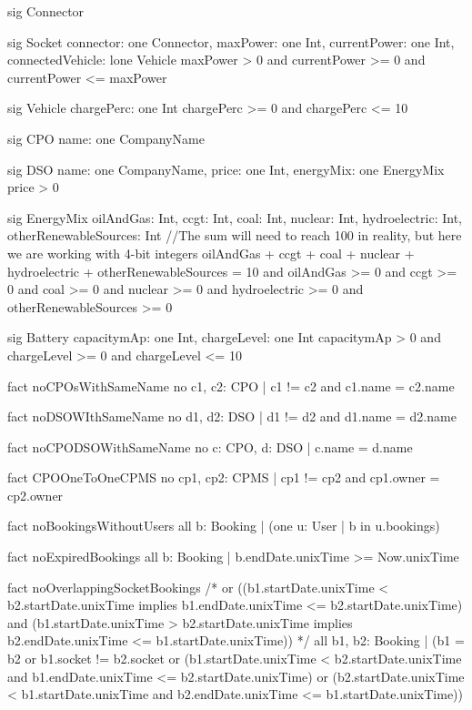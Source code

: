 \documentclass[11pt]{article}
\begin{document}
\begin{ffcode}
    sig Connector {}
    
    sig Socket {
    	connector: one Connector,
    	maxPower: one Int,
    	currentPower: one Int,
    	connectedVehicle: lone Vehicle
    } {
    	maxPower > 0
    	and currentPower >= 0
    	and currentPower <= maxPower
    }
    
    sig Vehicle {
    	chargePerc: one Int
    } {
    	chargePerc >= 0 and chargePerc <= 10
    }
    
    sig CPO {
    	name: one CompanyName
    }
    
    sig DSO {
    	name: one CompanyName,
    	price: one Int,
    	energyMix: one EnergyMix
    } {
    	price > 0
    }
    
    sig EnergyMix {
    	oilAndGas: Int,
    	ccgt: Int,
    	coal: Int,
    	nuclear: Int,
    	hydroelectric: Int,
    	otherRenewableSources: Int
    } {
    	//The sum will need to reach 100 in reality, but here we are working with 4-bit integers
    	oilAndGas + ccgt + coal + nuclear + hydroelectric + otherRenewableSources = 10
    	and oilAndGas >= 0
    	and ccgt >= 0
    	and coal >= 0
    	and nuclear >= 0
    	and hydroelectric >= 0
    	and otherRenewableSources >= 0
    }
    
    sig Battery {
    	capacitymAp: one Int,
    	chargeLevel: one Int
    } {
    	capacitymAp > 0 and
    	chargeLevel >= 0 and chargeLevel <= 10
    }
    
    fact noCPOsWithSameName {
    	no c1, c2: CPO | c1 != c2 and c1.name = c2.name
    }
    
    fact noDSOWIthSameName {
    	no d1, d2: DSO | d1 != d2 and d1.name = d2.name
    }
    
    fact noCPODSOWithSameName {
    	no c: CPO, d: DSO | c.name = d.name
    }
    
    fact CPOOneToOneCPMS {
    	no cp1, cp2: CPMS | cp1 != cp2 and cp1.owner = cp2.owner
    }
    
    fact noBookingsWithoutUsers {
    	all b: Booking | (one u: User | b in u.bookings)
    }
    
    fact noExpiredBookings {
    	all b: Booking | b.endDate.unixTime >= Now.unixTime
    }
    
    fact noOverlappingSocketBookings {
    	/*
    	or ((b1.startDate.unixTime < b2.startDate.unixTime implies b1.endDate.unixTime <= b2.startDate.unixTime) and (b1.startDate.unixTime > b2.startDate.unixTime implies b2.endDate.unixTime <= b1.startDate.unixTime))
    	*/
    	all b1, b2: Booking | (b1 = b2 or b1.socket != b2.socket or (b1.startDate.unixTime < b2.startDate.unixTime and b1.endDate.unixTime <= b2.startDate.unixTime)
    	or (b2.startDate.unixTime < b1.startDate.unixTime and b2.endDate.unixTime <= b1.startDate.unixTime))
    }
    

\end{ffcode}
\end{document}
